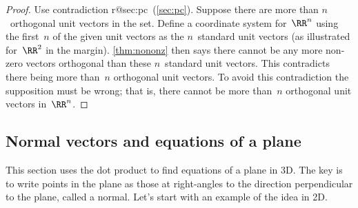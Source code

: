 \begin{proof} 
Use contradiction%
\ifcsname r@sec:pc\endcsname\ (\autoref{sec:pc})\fi.
Suppose there are more than \(n\)~orthogonal unit vectors in the set.
%
Define a coordinate system for~\(\RR^n\) using the first~\(n\) of the given unit vectors as the \(n\)~standard unit vectors 
(as illustrated for~\(\RR^2\) in the margin).
\autoref{thm:nononz} then says there cannot be any more non-zero vectors orthogonal than these \(n\)~standard unit vectors.
This contradicts there being more than~\(n\) orthogonal unit vectors.
To avoid this contradiction the supposition must be wrong; that is, there cannot be more than~\(n\) orthogonal unit vectors in~\(\RR^n\).
\end{proof}








\subsection{Normal vectors and equations of a plane}
\label{sec:nvep}


This section uses the dot product to find equations of a plane in 3D.
The key is to write points in the plane as those at right-angles to the direction perpendicular to the plane, called a normal.
Let's start with an example of the idea in 2D.

